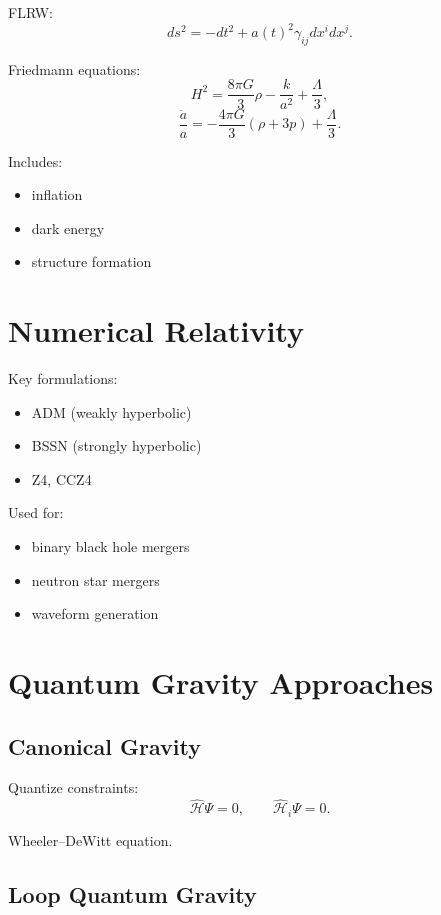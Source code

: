 \documentclass[12pt]{article}
\begin{document}
FLRW:
\[
ds^2 = -dt^2 + a(t)^2 \gamma_{ij}dx^i dx^j.
\]

Friedmann equations:
\[
H^2 = \frac{8\pi G}{3}\rho - \frac{k}{a^2} + \frac{\Lambda}{3},
\]
\[
\frac{\ddot a}{a} = -\frac{4\pi G}{3}(\rho+3p) + \frac{\Lambda}{3}.
\]

Includes:
\begin{itemize}
\item inflation
\item dark energy
\item structure formation
\end{itemize}

\section{Numerical Relativity}

Key formulations:
\begin{itemize}
\item ADM (weakly hyperbolic)
\item BSSN (strongly hyperbolic)
\item Z4, CCZ4
\end{itemize}

Used for:
\begin{itemize}
\item binary black hole mergers
\item neutron star mergers
\item waveform generation
\end{itemize}

\section{Quantum Gravity Approaches}

\subsection{Canonical Gravity}

Quantize constraints:
\[
\hat{\mathcal{H}}\Psi=0, \qquad 
\hat{\mathcal{H}}_i\Psi=0.
\]

Wheeler–DeWitt equation.

\subsection{Loop Quantum Gravity}
\end{document}
